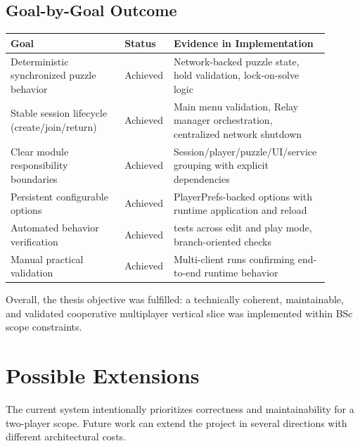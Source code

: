 \subsection*{Goal-by-Goal Outcome}
\begin{table}[H]
\centering
\caption{Thesis Goal Evaluation}
\label{tab:goal-evaluation}
\begin{longtable}{|>{\centering\arraybackslash}m{0.35\linewidth}|>{\centering\arraybackslash}m{0.1\linewidth}|>{\centering\arraybackslash}m{0.45\linewidth}|}
\hline
\hline
\textbf{Goal} & \textbf{Status} & \textbf{Evidence in Implementation} \\
\hline
Deterministic synchronized puzzle behavior & Achieved & Network-backed puzzle state, hold validation, lock-on-solve logic \\
\hline
Stable session lifecycle (create/join/return) & Achieved & Main menu validation, Relay manager orchestration, centralized network shutdown \\
\hline
Clear module responsibility boundaries & Achieved & Session/player/puzzle/UI/service grouping with explicit dependencies \\
\hline
Persistent configurable options & Achieved & PlayerPrefs-backed options with runtime application and reload \\
\hline
Automated behavior verification & Achieved & 90 tests across edit and play mode, branch-oriented checks \\
\hline
Manual practical validation & Achieved & Multi-client runs confirming end-to-end runtime behavior \\
\hline
\end{longtable}
\addtocounter{table}{-1}
\end{table}

Overall, the thesis objective was fulfilled: a technically coherent, maintainable, and validated cooperative multiplayer vertical slice was implemented within BSc scope constraints.

\section{Possible Extensions}
The current system intentionally prioritizes correctness and maintainability for a two-player scope. Future work can extend the project in several directions with different architectural costs.

\newpage

